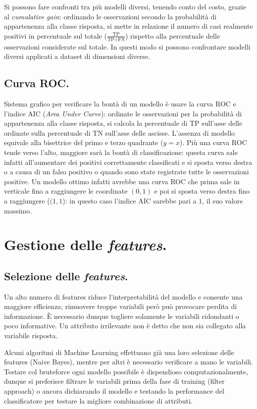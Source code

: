 \documentclass[11pt, a4page, twocolumn]{article}
\begin{document}
Si possono fare confronti tra più modelli diversi, tenendo conto del costo, grazie al \textit{cumulative gain}: ordinando le osservazioni secondo la probabilità di appartenenza alla classe risposta, si mette in relazione il numero di casi realmente positivi in percentuale sul totale ($\frac{\text{TP}}{\text{TP}+\text{FN}}$) rispetto alla percentuale delle osservazioni considerate sul totale.
In questi modo si possono confrontare modelli diversi applicati a dataset di dimensioni diverse.

\subsection{Curva ROC.}
Sistema grafico per verificare la bontà di un modello è usare la curva ROC e l'indice AIC (\textit{Area Under Curve}): ordinate le osservazioni per la probabilità di appartenenza alla classe risposta, si calcola la percentuale di TP sull'asse delle ordinate sulla percentuale di TN sull'asse delle ascisse.
L'assenza di modello equivale alla bisettrice del primo e terzo quadrante ($y = x$).
Più una curva ROC tende verso l'alto, maggiore sarà la bontà di classificazione: questa curva sale infatti all'aumentare dei positivi correttamente classificati e si sposta verso destra o a causa di un falso positivo o quando sono state registrate tutte le osservazioni positive.
Un modello ottimo infatti avrebbe una curva ROC che prima sale in verticale fino a raggiungere le coordinate $(0, 1)$ e poi si sposta verso destra fino a raggiungere ($(1, 1$): in questo caso l'indice AIC sarebbe pari a $1$, il suo valore massimo.


\section{Gestione delle \textit{features}.}

\subsection{Selezione delle \textit{features}.}
Un alto numero di features riduce l'interpretabilità del modello e consente una maggiore efficienza; rimuovere troppe variabili però può provocare perdita di informazione.
È necessario dunque togliere solamente le variabili ridondanti o poco informative.
Un attributo irrilevante non è detto che non sia collegato alla variabile risposta. \newline

Alcuni algoritmi di Machine Learning effettuano già una loro selezione delle features (Naive Bayes), mentre per altri è necessario verificare a mano le variabili.
Testare col bruteforce ogni modello possibile è dispendioso computazionalmente, dunque si preferisce filtrare le variabili prima della fase di training (filter approach) o ancora dichiarando il modello e testando la performance del classificatore per testare la migliore combinazione di attributi.
\end{document}

